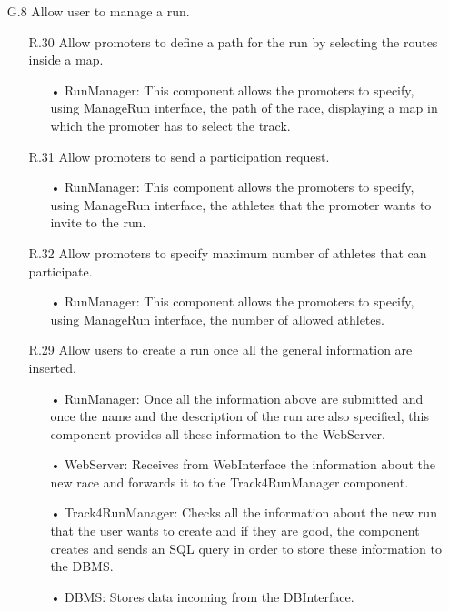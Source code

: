 \begin{enumerate}
\item [G.8] Allow user to manage a run.
	\begin{enumerate}
	\item [R.30] Allow promoters to define a path for the run by selecting the routes inside a map.
		\begin{enumerate}
		\item[•] RunManager: This component allows the promoters to specify, using ManageRun interface, the path of the race, displaying a map in which the promoter has to select the track.
		\end{enumerate}	
	\item [R.31] Allow promoters to send a participation request.
		\begin{enumerate}
		\item[•] RunManager: This component allows the promoters to specify, using ManageRun interface, the athletes that the promoter wants to invite to the run.
		\end{enumerate}	
	\item [R.32] Allow promoters to specify maximum number of athletes that can participate.
		\begin{enumerate}
		\item[•] RunManager: This component allows the promoters to specify, using ManageRun interface, the number of allowed athletes.
		\end{enumerate}	
	\item [R.29] Allow users to create a run once all the general information are inserted.
		\begin{enumerate}
		\item[•] RunManager: Once all the information above are submitted and once the name and the description of the run are also specified, this component provides all these information to the WebServer.
		\item[•] WebServer: Receives from WebInterface the information about the new race and forwards it to the Track4RunManager component.
		\item[•] Track4RunManager: Checks all the information about the new run that the user wants to create and if they are good, the component creates and sends an SQL query in order to store these information to the DBMS.
		\item[•] DBMS: Stores data incoming from the DBInterface.
		\end{enumerate}	
	\end{enumerate}	
	

\end{enumerate}
